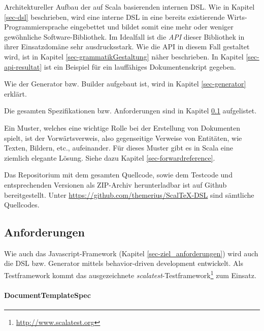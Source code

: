 Architektureller Aufbau der auf Scala basierenden internen DSL. Wie in
Kapitel \ref{sec-dsl} beschrieben, wird eine interne DSL in eine bereits
existierende Wirts-Programmiersprache eingebettet und bildet somit
eine mehr oder weniger gewöhn\-liche Software-Bibliothek. Im Idealfall ist
die \emph{API} dieser Bibliothek in ihrer Einsatzdomäne sehr ausdrucksstark.
Wie die API in diesem Fall gestaltet wird, ist in Kapitel
\ref{sec-grammatikGestaltung} näher beschrieben. In Kapitel
\ref{sec-api-resultat} ist ein Beispiel für ein lauffähiges
Dokumentenskript gegeben.

Wie der Generator bzw. Builder aufgebaut ist, wird in
Kapitel \ref{sec-generator} erklärt.

Die gesamten Spezifikationen bzw. Anforderungen sind in Kapitel
\ref{sec-dsl_anforderungen} aufgelistet.

Ein Muster, welches eine wichtige Rolle bei der Erstellung von Dokumenten
spielt, ist der Vorwärtsverweis, also gegenseitige Verweise von Entitäten,
wie Texten, Bildern, etc., aufeinander. Für dieses Muster gibt es in Scala
eine ziemlich elegante Lösung. Siehe dazu Kapitel \ref{sec-forwardreference}.

Das Repositorium mit dem gesamten Quellcode, sowie dem Testcode
und entsprechenden Versionen als ZIP-Archiv herunterladbar ist auf Github bereitgestellt.
Unter \url{https://github.com/themerius/ScalTeX-DSL} sind sämtliche
Quellcodes.

\subsection{Anforderungen}\label{sec-dsl_anforderungen}

Wie auch das Javascript-Framework (Kapitel \ref{sec-ziel_anforderungen})
wird auch die DSL bzw. Generator mittels behavior-driven development entwickelt.
Als Testframework kommt das ausgezeichnete
\emph{scalatest}-Testframework\footnote{
\url{http://www.scalatest.org}} zum Einsatz.

\paragraph{DocumentTemplateSpec}

